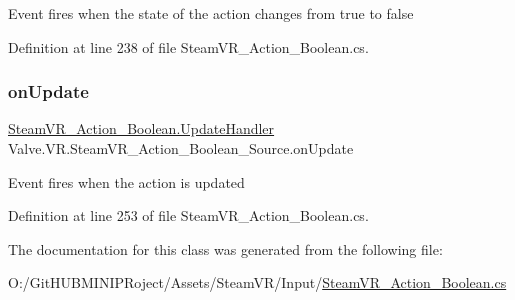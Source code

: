 Event fires when the state of the action changes from true to false 



Definition at line 238 of file Steam\+V\+R\+\_\+\+Action\+\_\+\+Boolean.\+cs.

\mbox{\label{class_valve_1_1_v_r_1_1_steam_v_r___action___boolean___source_a415211a4f88a14bcd67b25bf9daff709}} 
\subsubsection{\texorpdfstring{onUpdate}{onUpdate}}
{\footnotesize\ttfamily \mbox{\hyperlink{class_valve_1_1_v_r_1_1_steam_v_r___action___boolean_ab9ee21a88a5d5d23603465c55796fcf5}{Steam\+V\+R\+\_\+\+Action\+\_\+\+Boolean.\+Update\+Handler}} Valve.\+V\+R.\+Steam\+V\+R\+\_\+\+Action\+\_\+\+Boolean\+\_\+\+Source.\+on\+Update}



Event fires when the action is updated 



Definition at line 253 of file Steam\+V\+R\+\_\+\+Action\+\_\+\+Boolean.\+cs.



The documentation for this class was generated from the following file\+:\begin{DoxyCompactItemize}
\item 
O\+:/\+Git\+H\+U\+B\+M\+I\+N\+I\+P\+Roject/\+Assets/\+Steam\+V\+R/\+Input/\mbox{\hyperlink{_steam_v_r___action___boolean_8cs}{Steam\+V\+R\+\_\+\+Action\+\_\+\+Boolean.\+cs}}\end{DoxyCompactItemize}
